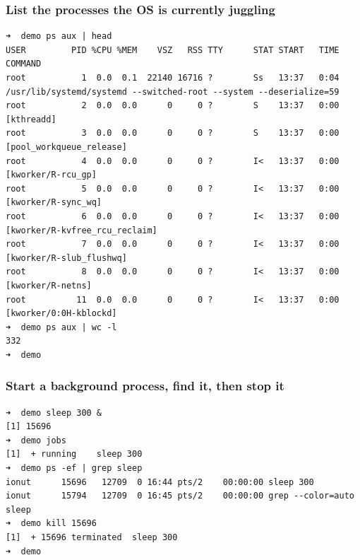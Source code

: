 \documentclass{labreport}
\begin{document}
\subsubsection{List the processes the OS is currently juggling}
\begin{lstlisting}[style=bash]
➜  demo ps aux | head
USER         PID %CPU %MEM    VSZ   RSS TTY      STAT START   TIME COMMAND
root           1  0.0  0.1  22140 16716 ?        Ss   13:37   0:04 /usr/lib/systemd/systemd --switched-root --system --deserialize=59
root           2  0.0  0.0      0     0 ?        S    13:37   0:00 [kthreadd]
root           3  0.0  0.0      0     0 ?        S    13:37   0:00 [pool_workqueue_release]
root           4  0.0  0.0      0     0 ?        I<   13:37   0:00 [kworker/R-rcu_gp]
root           5  0.0  0.0      0     0 ?        I<   13:37   0:00 [kworker/R-sync_wq]
root           6  0.0  0.0      0     0 ?        I<   13:37   0:00 [kworker/R-kvfree_rcu_reclaim]
root           7  0.0  0.0      0     0 ?        I<   13:37   0:00 [kworker/R-slub_flushwq]
root           8  0.0  0.0      0     0 ?        I<   13:37   0:00 [kworker/R-netns]
root          11  0.0  0.0      0     0 ?        I<   13:37   0:00 [kworker/0:0H-kblockd]
➜  demo ps aux | wc -l
332
➜  demo
\end{lstlisting}

\subsubsection{Start a background process, find it, then stop it}
\begin{lstlisting}[style=bash]
➜  demo sleep 300 &
[1] 15696
➜  demo jobs
[1]  + running    sleep 300
➜  demo ps -ef | grep sleep
ionut      15696   12709  0 16:44 pts/2    00:00:00 sleep 300
ionut      15794   12709  0 16:45 pts/2    00:00:00 grep --color=auto sleep
➜  demo kill 15696
[1]  + 15696 terminated  sleep 300
➜  demo
\end{lstlisting}
\end{document}
